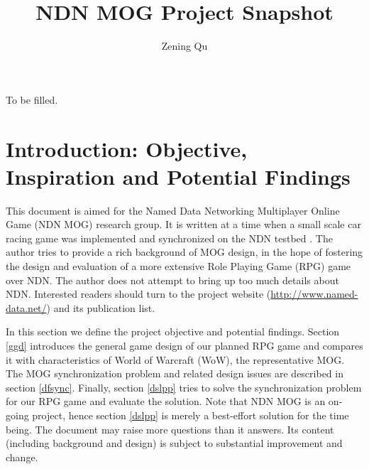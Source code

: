 \documentclass{article}
\begin{document}
\title{NDN MOG Project Snapshot}
\author{Zening Qu}
\maketitle

\abstract
To be filled.

\tableofcontents
\listoffigures
\listoftables
\newpage

\section{Introduction: Objective, Inspiration and Potential Findings}
\label{itro}


This document is aimed for the Named Data Networking Multiplayer Online Game (NDN MOG) research group. It is written at a time when a small scale car racing game was implemented and synchronized on the NDN testbed \cite{egalcar}. The author tries to provide a rich background of MOG design, in the hope of fostering the design and evaluation of a more extensive Role Playing Game (RPG) game over NDN. The author does not attempt to bring up too much details about NDN. Interested readers should turn to the project website (\href{http://www.named-data.net/}{http://www.named-data.net/}) and its publication list.

In this section we define the project objective and potential findings. Section \ref{ggd} introduces the general game design of our planned RPG game and compares it with characteristics of World of Warcraft (WoW), the representative MOG. The MOG synchronization problem and related design issues are described in section \ref{dfsync}. Finally, section \ref{dslpp} tries to solve the synchronization problem for our RPG game and evaluate the solution. Note that NDN MOG is an on-going project, hence section \ref{dslpp} is merely a best-effort solution for the time being. The document may raise more questions than it answers. Its content (including background and design) is subject to substantial improvement and change.
\end{document}
